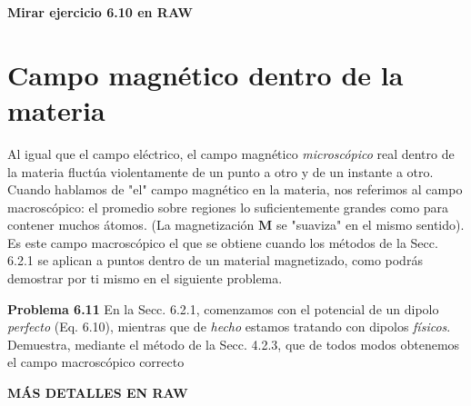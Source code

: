 \documentclass[12pt,a4paper]{report}
\newcommand{\esp}{\vspace{0.5cm}}
\begin{document}
	\esp
	
	\noindent \textbf{Mirar ejercicio 6.10 en RAW}
	
	\esp
	
	\section{Campo magnético dentro de la materia}
	
	Al igual que el campo eléctrico, el campo magnético \textit{microscópico} real dentro de la materia fluctúa violentamente de un punto a otro y de un instante a otro. Cuando hablamos de "el" campo magnético en la materia, nos referimos al campo macroscópico: el promedio sobre regiones lo suficientemente grandes como para contener muchos átomos. (La magnetización $\mathbf{M}$ se "suaviza" en el mismo sentido). Es este campo macroscópico el que se obtiene cuando los métodos de la Secc. 6.2.1 se aplican a puntos dentro de un material magnetizado, como podrás demostrar por ti mismo en el siguiente problema.
	
	\esp
	
	\textbf{Problema 6.11} En la Secc. 6.2.1, comenzamos con el potencial de un dipolo \textit{perfecto} (Eq. 6.10), mientras que de \textit{hecho} estamos tratando con dipolos \textit{físicos}. Demuestra, mediante el método de la Secc. 4.2.3, que de todos modos obtenemos el campo macroscópico correcto
	
	\esp
	
	\noindent \textbf{MÁS DETALLES EN RAW}
	
	\printbibliography[title={Bibliografía}]
\end{document}
